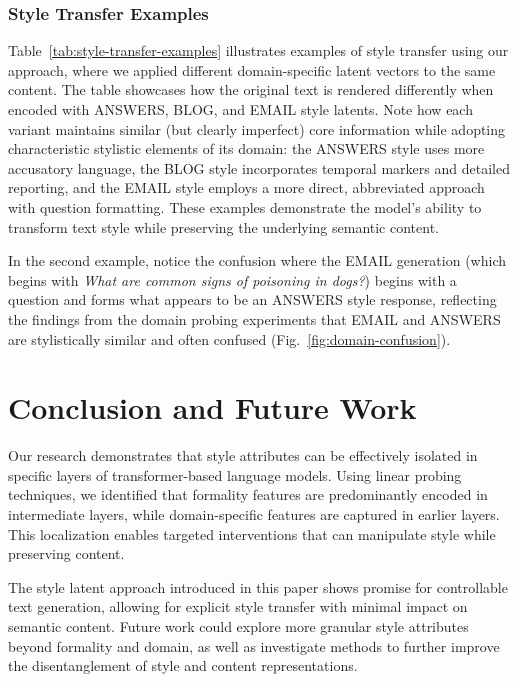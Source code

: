 \documentclass{article}
\begin{document}
\subsubsection{Style Transfer Examples}

Table~\ref{tab:style-transfer-examples} illustrates examples of style transfer using our approach, where we applied different domain-specific latent vectors to the same content.
The table showcases how the original text is rendered differently when encoded with ANSWERS, BLOG, and EMAIL style latents.
Note how each variant maintains similar (but clearly imperfect) core information while adopting characteristic stylistic elements of its domain: the ANSWERS style uses more accusatory language, the BLOG style incorporates temporal markers and detailed reporting, and the EMAIL style employs a more direct, abbreviated approach with question formatting.
These examples demonstrate the model's ability to transform text style while preserving the underlying semantic content.

In the second example, notice the confusion where the EMAIL generation (which begins with \textit{What are common signs of poisoning in dogs?}) begins with a question and forms what appears to be an ANSWERS style response, reflecting the findings from the domain probing experiments that EMAIL and ANSWERS are stylistically similar and often confused (Fig.~\ref{fig:domain-confusion}).


\section{Conclusion and Future Work}

Our research demonstrates that style attributes can be effectively isolated in specific layers of transformer-based language models. Using linear probing techniques, we identified that formality features are predominantly encoded in intermediate layers, while domain-specific features are captured in earlier layers. This localization enables targeted interventions that can manipulate style while preserving content.

The style latent approach introduced in this paper shows promise for controllable text generation, allowing for explicit style transfer with minimal impact on semantic content. Future work could explore more granular style attributes beyond formality and domain, as well as investigate methods to further improve the disentanglement of style and content representations.


\small

\end{document}
